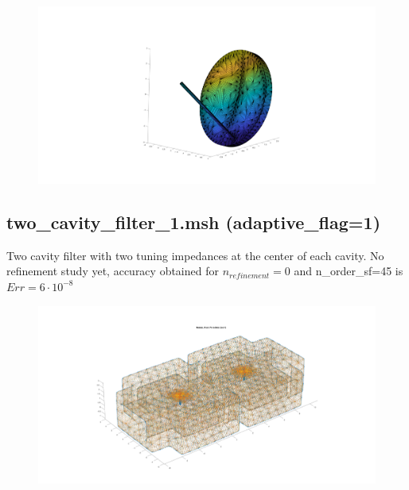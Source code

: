 \documentclass[11pt, oneside]{article}   	%
\begin{document}
\begin{figure}[H]
\begin{center}
\includegraphics[width=6in]{parabolic_antenna_skeleton.pdf}
\end{center}
\caption{}
\label{parabolic_antenna_skeleton}
\end{figure}







\newpage
\subsection{two\_cavity\_filter\_1.msh (adaptive\_flag=1)}
Two cavity filter with two tuning impedances at the center of each cavity. No refinement study yet, accuracy obtained for $n_{refinement}=0$ and n\_order\_sf=45 is $Err=6\cdot 10^{-8}$


\begin{figure}[H]
\begin{center}
\includegraphics[width=7in]{two_cavity_filter_1.pdf}
\end{center}
\caption{}
\label{two_cavity_filter_1}
\end{figure}
\end{document}
